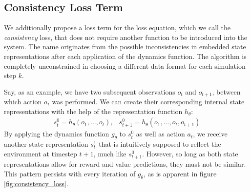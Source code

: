 \subsection{Consistency Loss Term}
We additionally propose a loss term for the loss equation, which we call the \textit{consistency} loss, that does not require another function to be introduced into the system. The name originates from the possible inconsistencies in embedded state representations after each application of the dynamics function. The algorithm is completely unconstrained in choosing a different data format for each simulation step $k$.

Say, as an example, we have two subsequent observations $o_t$ and $o_{t+1}$, between which action $a_t$ was performed. We can create their corresponding internal state representations with the help of the representation function $h_\theta$:
\begin{equation*}
    \begin{array}{cc}
        s^0_t = h_\theta(o_1, ..., o_t), &
        s^0_{t+1} = h_\theta(o_1, ..., o_t, o_{t+1})
    \end{array}
\end{equation*}
By applying the dynamics function $g_\theta$ to $s_t^0$ as well as action $a_t$, we receive another state representation $s_t^1$ that is intuitively supposed to reflect the environment at timestep $t+1$, much like $s_{t+1}^0$. However, so long as both state representations allow for reward and value predictions, they must not be similar. This pattern persists with every iteration of $g_\theta$, as is apparent in figure \ref{fig:consistency_loss}.
